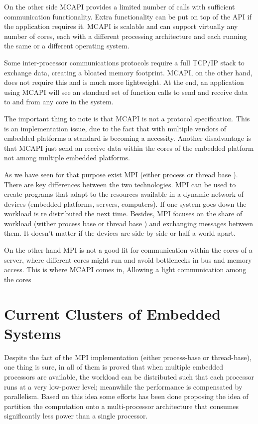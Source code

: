 On the other side MCAPI provides a limited number of calls with sufficient
communication functionality. Extra functionality can be put on top of the API
if the application requires it. MCAPI is scalable and can support virtually any
number of cores, each with a different processing architecture and each running
the same or a different operating system.

Some inter-processor communications protocols \cite{Wolf} require a full TCP/IP
stack to exchange data, creating a bloated memory footprint. MCAPI, on the
other hand, does not require this and is much more lightweight. At the end, an
application using MCAPI will see an standard set of function calls to send and
receive data to and from any core in the system. 

The important thing to note is that MCAPI is not a protocol specification. This
is an implementation issue, due to the fact that with multiple vendors of
embedded platforms a standard is becoming a necessity. Another disadvantage is
that MCAPI just send an receive data within the cores of the embedded platform
not among multiple embedded platforms. 

As we have seen for that purpose exist MPI (either process or thread base ).
There are key differences between the two technologies. MPI can be used to
create programs that adapt to the resources available in a dynamic network of
devices (embedded platforms, servers, computers). If one system goes down the
workload is re distributed the next time. Besides, MPI focuses on the share of
workload (wither process base or thread base ) and exchanging messages between
them. It doesn't matter if the devices are side-by-side or half a world apart. 

On the other hand MPI is not a good fit for communication within the cores of a
server, where different cores might run and avoid bottlenecks in bus and memory
access. This is where MCAPI comes in, Allowing a light communication among the
cores 

\section{Current Clusters of Embedded Systems}

Despite the fact of the MPI implementation (either process-base or
thread-base), one thing is sure, in all of them is proved that when multiple
embedded processors are available, the workload can be distributed such that
each processor runs at a very low-power level; meanwhile the performance is
compensated by parallelism. Based on this idea some efforts has been done
\cite{Liu} \cite{Weglarz} proposing the idea of partition the computation onto
a multi-processor architecture that consumes significantly less power than a
single processor.

